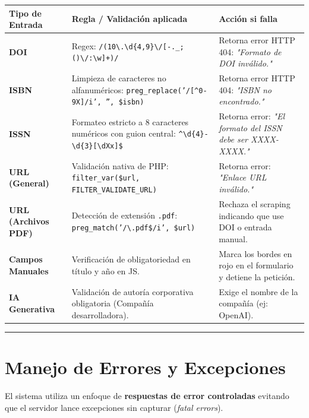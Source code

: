 \documentclass[11pt, a4paper]{article}
\begin{document}
\begin{longtable}{|p{5.3cm}|p{5.3cm}|p{5.3cm}|}
\hline
\textbf{Tipo de Entrada} & \textbf{Regla / Validación aplicada} & \textbf{Acción si falla} \\
\hline
\endhead
\textbf{DOI} & Regex: \texttt{/(10\textbackslash{}.\textbackslash{}d\{4,9\}\textbackslash{}/[-.\_;()\textbackslash{}/:\textbackslash{}w]+)/} & Retorna error HTTP 404: \textit{"Formato de DOI inválido."} \\
\hline
\textbf{ISBN} & Limpieza de caracteres no alfanuméricos: \texttt{preg\_replace('/[\textasciicircum{}0-9X]/i', '', \$isbn)} & Retorna error HTTP 404: \textit{"ISBN no encontrado."} \\
\hline
\textbf{ISSN} & Formateo estricto a 8 caracteres numéricos con guion central: \texttt{\textasciicircum{}\textbackslash{}d\{4\}-\textbackslash{}d\{3\}[\textbackslash{}dXx]\$} & Retorna error: \textit{"El formato del ISSN debe ser XXXX-XXXX."} \\
\hline
\textbf{URL (General)} & Validación nativa de PHP: \texttt{filter\_var(\$url, FILTER\_VALIDATE\_URL)} & Retorna error: \textit{"Enlace URL inválido."} \\
\hline
\textbf{URL (Archivos PDF)} & Detección de extensión \texttt{.pdf}: \texttt{preg\_match('/\textbackslash{}.pdf\$/i', \$url)} & Rechaza el scraping indicando que use DOI o entrada manual. \\
\hline
\textbf{Campos Manuales} & Verificación de obligatoriedad en título y año en JS. & Marca los bordes en rojo en el formulario y detiene la petición. \\
\hline
\textbf{IA Generativa} & Validación de autoría corporativa obligatoria (Compañía desarrolladora). & Exige el nombre de la compañía (ej: OpenAI). \\
\hline
\end{longtable}


\bigskip\noindent\rule{\textwidth}{0.4pt}\bigskip


\section{Manejo de Errores y Excepciones}

El sistema utiliza un enfoque de \textbf{respuestas de error controladas} evitando que el servidor lance excepciones sin capturar (\textit{fatal errors}).
\end{document}
